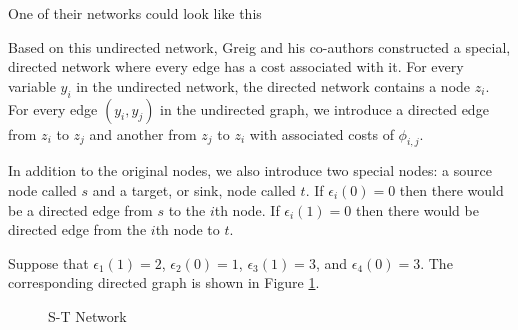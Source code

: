 One of their networks could look like this

\begin{figure}[!h]
\centering


\end{figure}

Based on this undirected network, Greig and his co-authors constructed
a special, directed network where every edge has a cost associated
with it. For every variable $y_i$ in the undirected network, the
directed network contains a node $z_i$.  For every edge $(y_i, y_j)$ in the
undirected graph, we introduce a directed edge from $z_i$ to $z_j$ and
another from $z_j$ to $z_i$ with associated costs of $\phi_{i,j}$.

In addition to the original nodes, we also introduce two special
nodes: a source node called $s$ and a target, or sink, node called
$t$. If $\epsilon_i(0) = 0$ then there would be a directed edge from
$s$ to the $i$th node. If $\epsilon_i(1) = 0$ then there would be
directed edge from the $i$th node to $t$.

Suppose that $\epsilon_1(1)=2$, $\epsilon_2(0)=1$, $\epsilon_3(1)=3$,
and $\epsilon_4(0)=3$. The corresponding directed graph is shown in
Figure \ref{fig:directed}. 

\begin{figure}[!h]
\centering

\caption{S-T Network}
\label{fig:directed}
\end{figure}

